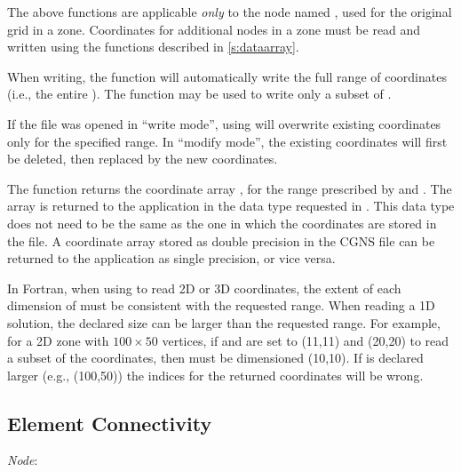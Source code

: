 The above functions are applicable \emph{only} to the 
 node named , used
for the original grid in a zone.
Coordinates for additional  nodes in a zone
must be read and written using the  functions
described in \autoref{s:dataarray}.

When writing, the function  will
automatically write the full range of coordinates (i.e., the entire
).
The function  may be used to write
only a subset of .

If the file was opened in ``write mode'', using 
will overwrite existing coordinates only for the specified range.
In ``modify mode'', the existing coordinates will first be deleted, then
replaced by the new coordinates.

The function  returns the coordinate array
, for the range prescribed by  and
.
The array is returned to the application in the data type requested in
.
This data type does not need to be the same as the one in which the
coordinates are stored in the file.
A coordinate array stored as double precision in the CGNS file can be
returned to the application as single precision, or vice versa.

In Fortran, when using  to read 2D or 3D
coordinates, the extent of each dimension of  must
be consistent with the requested range.
When reading a 1D solution, the declared size can be larger than the
requested range.
For example, for a 2D zone with $100 \times 50$ vertices, if
 and  are set to (11,11) and (20,20)
to read a subset of the coordinates, then  must be
dimensioned (10,10).
If  is declared larger (e.g., (100,50)) the
indices for the returned coordinates will be wrong.

\newpage
\subsection{Element Connectivity}
\label{s:elements}

\noindent
\textit{Node}: 


